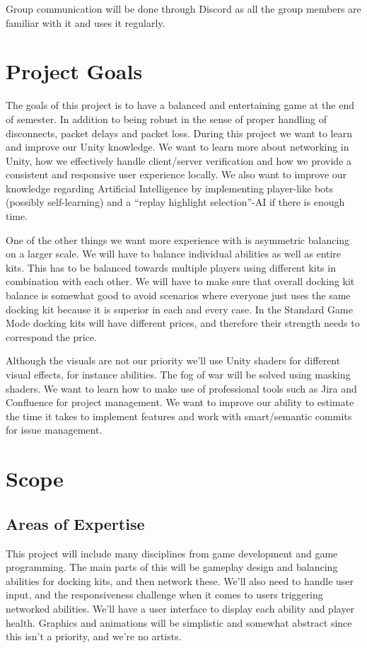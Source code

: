 Group communication will be done through Discord as all the group members are familiar with it and uses it regularly.

\section{Project Goals}
The goals of this project is to have a balanced and entertaining game at the end of semester. In addition to being robust in the sense of proper handling of disconnects, packet delays and packet loss.  During this project we want to learn and improve our Unity knowledge. We want to learn more about networking in Unity, how we effectively handle client/server verification and how we provide a consistent and responsive user experience locally. We also want to improve our knowledge regarding Artificial Intelligence by implementing player-like bots (possibly self-learning) and a “replay highlight selection”-AI if there is enough time. 

One of the other things we want more experience with is asymmetric balancing on a larger scale. We will have to balance individual abilities as well as entire kits. This has to be balanced towards multiple players using different kits in combination with each other. We will have to make sure that overall docking kit balance is somewhat good to avoid scenarios where everyone just uses the same docking kit because it is superior in each and every case. In the Standard Game Mode docking kits will have different prices, and therefore their strength needs to correspond the price.

Although the visuals are not our priority we’ll use Unity shaders for different visual effects, for instance abilities. The fog of war will be solved using masking shaders. We want to learn how to make use of professional tools such as Jira and Confluence for project management. We want to improve our ability to estimate the time it takes to implement features and work with smart/semantic commits for issue management.  

\section{Scope}
\subsection*{Areas of Expertise}
This project will include many disciplines from game development and game programming. The main parts of this will be gameplay design and balancing abilities for docking kits, and then network these. We’ll also need to handle user input, and the responsiveness challenge when it comes to users triggering networked abilities. We’ll have a user interface to display each ability and player health. Graphics and animations will be simplistic and somewhat abstract since this isn’t a priority, and we’re no artists.


